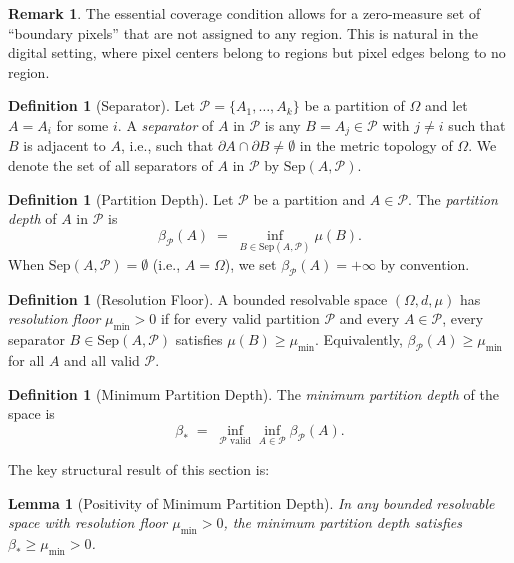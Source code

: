 \documentclass[twocolumn]{article}
\theoremstyle{plain}
\newtheorem{lemma}[theorem]{Lemma}
\theoremstyle{definition}
\newtheorem{definition}[theorem]{Definition}
\newtheorem{remark}[theorem]{Remark}
\newcommand{\PP}{\mathcal{P}}
\newcommand{\partdep}{\beta_{\PP}}
\newcommand{\bstar}{\beta_*}
\newcommand{\mumin}{\mu_{\min}}
\begin{document}
\begin{remark}
The essential coverage condition allows for a zero-measure set of ``boundary
pixels'' that are not assigned to any region. This is natural in the digital
setting, where pixel centers belong to regions but pixel edges belong to no
region.
\end{remark}

\begin{definition}[Separator]
\label{def:separator}
Let $\PP = \{A_1, \ldots, A_k\}$ be a partition of $\Omega$ and let $A = A_i$
for some $i$. A \emph{separator} of $A$ in $\PP$ is any $B = A_j \in \PP$
with $j \neq i$ such that $B$ is adjacent to $A$, i.e., such that
$\partial A \cap \partial B \neq \emptyset$ in the metric topology of $\Omega$.
We denote the set of all separators of $A$ in $\PP$ by $\mathrm{Sep}(A, \PP)$.
\end{definition}

\begin{definition}[Partition Depth]
\label{def:partdep}
Let $\PP$ be a partition and $A \in \PP$. The \emph{partition depth} of $A$ in
$\PP$ is
\[
  \partdep(A) \;=\; \inf_{B \in \mathrm{Sep}(A,\PP)} \mu(B).
\]
When $\mathrm{Sep}(A,\PP) = \emptyset$ (i.e., $A = \Omega$), we set
$\partdep(A) = +\infty$ by convention.
\end{definition}

\begin{definition}[Resolution Floor]
\label{def:resfloor}
A bounded resolvable space $(\Omega, d, \mu)$ has \emph{resolution floor}
$\mumin > 0$ if for every valid partition $\PP$ and every $A \in \PP$,
every separator $B \in \mathrm{Sep}(A,\PP)$ satisfies $\mu(B) \geq \mumin$.
Equivalently, $\partdep(A) \geq \mumin$ for all $A$ and all valid $\PP$.
\end{definition}

\begin{definition}[Minimum Partition Depth]
\label{def:minpartdep}
The \emph{minimum partition depth} of the space is
\[
  \bstar \;=\; \inf_{\PP \text{ valid}} \inf_{A \in \PP} \partdep(A).
\]
\end{definition}

The key structural result of this section is:

\begin{lemma}[Positivity of Minimum Partition Depth]
\label{lem:posfloor}
In any bounded resolvable space with resolution floor $\mumin > 0$, the minimum
partition depth satisfies $\bstar \geq \mumin > 0$.
\end{lemma}
\end{document}
